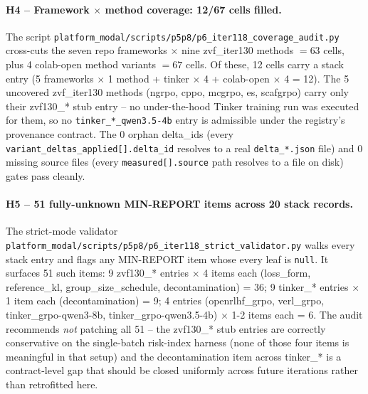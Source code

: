 \documentclass{article}
\begin{document}
\paragraph{H4 -- Framework $\times$ method coverage: 12/67 cells filled.}
The script \texttt{platform_modal/scripts/p5p8/p6\_iter118\_coverage\_audit.py} cross-cuts
the seven repo frameworks $\times$ nine zvf\_iter130 methods $= 63$ cells,
plus 4 colab-open method variants $= 67$ cells. Of these, 12 cells carry
a stack entry (5 frameworks $\times$ {1 method} + tinker $\times$ 4 +
colab-open $\times$ 4 = 12). The 5 uncovered zvf\_iter130 methods (ngrpo,
cppo, mcgrpo, es, scafgrpo) carry only their zvf130\_* stub entry -- no
under-the-hood Tinker training run was executed for them, so no
\texttt{tinker\_*\_qwen3.5-4b} entry is admissible under the registry's
provenance contract. The 0 orphan delta\_ids (every
\texttt{variant\_deltas\_applied[].delta\_id} resolves to a real
\texttt{delta\_*.json} file) and 0 missing source files (every
\texttt{measured[].source} path resolves to a file on disk) gates pass
cleanly.

\paragraph{H5 -- 51 fully-unknown MIN-REPORT items across 20 stack records.}
The strict-mode validator \texttt{platform_modal/scripts/p5p8/p6\_iter118\_strict\_validator.py}
walks every stack entry and flags any MIN-REPORT item whose every leaf is
\texttt{null}. It surfaces 51 such items:
9 zvf130\_* entries $\times$ 4 items each (loss\_form, reference\_kl,
group\_size\_schedule, decontamination) = 36; 9 tinker\_* entries
$\times$ 1 item each (decontamination) = 9; 4 entries
(openrlhf\_grpo, verl\_grpo, tinker\_grpo-qwen3-8b, tinker\_grpo-qwen3.5-4b)
$\times$ 1-2 items each = 6. The audit recommends \emph{not} patching all
51 -- the zvf130\_* stub entries are correctly conservative on the
single-batch risk-index harness (none of those four items is meaningful
in that setup) and the decontamination item across tinker\_* is a
contract-level gap that should be closed uniformly across future
iterations rather than retrofitted here.
\end{document}

